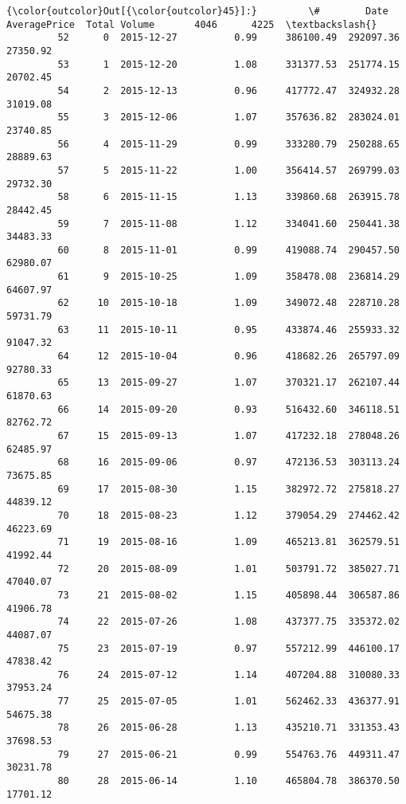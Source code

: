 \documentclass[11pt]{article}
\begin{document}
\begin{Verbatim}[commandchars=\\\{\}]
{\color{outcolor}Out[{\color{outcolor}45}]:}         \#        Date  AveragePrice  Total Volume       4046      4225  \textbackslash{}
         52      0  2015-12-27          0.99     386100.49  292097.36  27350.92   
         53      1  2015-12-20          1.08     331377.53  251774.15  20702.45   
         54      2  2015-12-13          0.96     417772.47  324932.28  31019.08   
         55      3  2015-12-06          1.07     357636.82  283024.01  23740.85   
         56      4  2015-11-29          0.99     333280.79  250288.65  28889.63   
         57      5  2015-11-22          1.00     356414.57  269799.03  29732.30   
         58      6  2015-11-15          1.13     339860.68  263915.78  28442.45   
         59      7  2015-11-08          1.12     334041.60  250441.38  34483.33   
         60      8  2015-11-01          0.99     419088.74  290457.50  62980.07   
         61      9  2015-10-25          1.09     358478.08  236814.29  64607.97   
         62     10  2015-10-18          1.09     349072.48  228710.28  59731.79   
         63     11  2015-10-11          0.95     433874.46  255933.32  91047.32   
         64     12  2015-10-04          0.96     418682.26  265797.09  92780.33   
         65     13  2015-09-27          1.07     370321.17  262107.44  61870.63   
         66     14  2015-09-20          0.93     516432.60  346118.51  82762.72   
         67     15  2015-09-13          1.07     417232.18  278048.26  62485.97   
         68     16  2015-09-06          0.97     472136.53  303113.24  73675.85   
         69     17  2015-08-30          1.15     382972.72  275818.27  44839.12   
         70     18  2015-08-23          1.12     379054.29  274462.42  46223.69   
         71     19  2015-08-16          1.09     465213.81  362579.51  41992.44   
         72     20  2015-08-09          1.01     503791.72  385027.71  47040.07   
         73     21  2015-08-02          1.15     405898.44  306587.86  41906.78   
         74     22  2015-07-26          1.08     437377.75  335372.02  44087.07   
         75     23  2015-07-19          0.97     557212.99  446100.17  47838.42   
         76     24  2015-07-12          1.14     407204.88  310080.33  37953.24   
         77     25  2015-07-05          1.01     562462.33  436377.91  54675.38   
         78     26  2015-06-28          1.13     435210.71  331353.43  37698.53   
         79     27  2015-06-21          0.99     554763.76  449311.47  30231.78   
         80     28  2015-06-14          1.10     465804.78  386370.50  17701.12   

\end{Verbatim}
\end{document}
